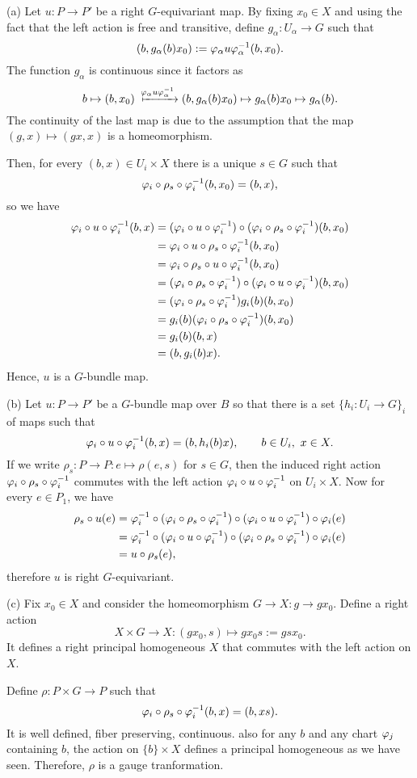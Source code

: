 \documentclass{../../large}
\begin{document}
\begin{pf}
(a)
Let $u:P\to P'$ be a right $G$-equivariant map.
By fixing $x_0\in X$ and using the fact that the left action is free and transitive, define $g_\alpha:U_\alpha\to G$ such that
\[(b,g_\alpha(b)x_0):=\varphi_\alpha u\varphi_\alpha^{-1}(b,x_0).\]
The function $g_\alpha$ is continuous since it factors as
\[b\mapsto(b,x_0)\xmapsto{\f_\alpha u\f_\alpha^{-1}}(b,g_\alpha(b)x_0)\mapsto g_\alpha(b)x_0\mapsto g_\alpha(b).\]
The continuity of the last map is due to the assumption that the map $(g,x)\mapsto(gx,x)$ is a homeomorphism.

Then, for every $(b,x)\in U_i\times X$ there is a unique $s\in G$ such that
\[\varphi_i\circ\rho_s\circ\varphi_i^{-1}(b,x_0)=(b,x),\]
so we have
\begin{align*}
\varphi_i\circ u\circ\varphi_i^{-1}(b,x)
&=(\varphi_i\circ u\circ\varphi_i^{-1})\circ(\varphi_i\circ\rho_s\circ\varphi_i^{-1})(b,x_0)\\
&=\varphi_i\circ u\circ\rho_s\circ\varphi_i^{-1}(b,x_0)\\
&=\varphi_i\circ\rho_s\circ u\circ\varphi_i^{-1}(b,x_0)\\
&=(\varphi_i\circ\rho_s\circ\varphi_i^{-1})\circ(\varphi_i\circ u\circ\varphi_i^{-1})(b,x_0)\\
&=(\varphi_i\circ\rho_s\circ\varphi_i^{-1})g_i(b)(b,x_0)\\
&=g_i(b)(\varphi_i\circ\rho_s\circ\varphi_i^{-1})(b,x_0)\\
&=g_i(b)(b,x)\\
&=(b,g_i(b)x).
\end{align*}
Hence, $u$ is a $G$-bundle map.

(b)
Let $u:P\to P'$ be a $G$-bundle map over $B$ so that there is a set $\{h_i:U_i\to G\}_i$ of maps such that
\[\varphi_i\circ u\circ\varphi_i^{-1}(b,x)=(b,h_i(b)x),
\qquad b\in U_i,\ x\in X.\]
If we write $\rho_s:P\to P:e\mapsto \rho(e,s)$ for $s\in G$, then the induced right action $\varphi_i\circ\rho_s\circ\varphi_i^{-1}$ commutes with the left action $\varphi_i\circ u\circ\varphi_i^{-1}$ on $U_i\times X$.
Now for every $e\in P_1$, we have
\begin{align*}
\rho_s\circ u(e)
&=\varphi_i^{-1}\circ(\varphi_i\circ\rho_s\circ\varphi_i^{-1})\circ(\varphi_i\circ u\circ\varphi_i^{-1})\circ\varphi_i(e)\\
&=\varphi_i^{-1}\circ(\varphi_i\circ u\circ\varphi_i^{-1})\circ(\varphi_i\circ\rho_s\circ\varphi_i^{-1})\circ\varphi_i(e)\\
&=u\circ\rho_s(e),
\end{align*}
therefore $u$ is right $G$-equivariant.


(c)
Fix $x_0\in X$ and consider the homeomorphism $G\to X:g\to gx_0$.
Define a right action
\[X\times G\to X:(gx_0,s)\mapsto gx_0s:=gsx_0.\]
It defines a right principal homogeneous $X$ that commutes with the left action on $X$.

Define $\rho:P\times G\to P$ such that
\[\varphi_i\circ\rho_s\circ\varphi_i^{-1}(b,x)=(b,xs).\]
It is well defined, fiber preserving, continuous.
also for any $b$ and any chart $\varphi_j$ containing $b$, the action on $\{b\}\times X$ defines a principal homogeneous as we have seen.
Therefore, $\rho$ is a gauge tranformation.

\end{pf}
\end{document}
